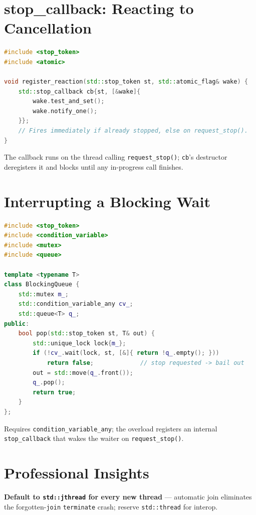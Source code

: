 \section{stop\_callback: Reacting to Cancellation}
\label{sec:c20-jthread-callback}

\begin{lstlisting}[language=C++,caption={Running code the instant a stop is requested}]
#include <stop_token>
#include <atomic>

void register_reaction(std::stop_token st, std::atomic_flag& wake) {
    std::stop_callback cb{st, [&wake]{
        wake.test_and_set();
        wake.notify_one();
    }};
    // Fires immediately if already stopped, else on request_stop().
}
\end{lstlisting}

The callback runs on the thread calling \texttt{request\_stop()}; \texttt{cb}'s destructor deregisters it and blocks until any in-progress call finishes.

\section{Interrupting a Blocking Wait}
\label{sec:c20-jthread-wait}

\begin{lstlisting}[language=C++,caption={A condition-variable wait that honors cancellation}]
#include <stop_token>
#include <condition_variable>
#include <mutex>
#include <queue>

template <typename T>
class BlockingQueue {
    std::mutex m_;
    std::condition_variable_any cv_;
    std::queue<T> q_;
public:
    bool pop(std::stop_token st, T& out) {
        std::unique_lock lock{m_};
        if (!cv_.wait(lock, st, [&]{ return !q_.empty(); }))
            return false;             // stop requested -> bail out
        out = std::move(q_.front());
        q_.pop();
        return true;
    }
};
\end{lstlisting}

Requires \texttt{condition\_variable\_any}; the overload registers an internal \texttt{stop\_callback} that wakes the waiter on \texttt{request\_stop()}.

\section{Professional Insights}
\label{sec:c20-jthread-insights}

\textbf{Default to \texttt{std::jthread} for every new thread} --- automatic join eliminates the forgotten-\texttt{join} \texttt{terminate} crash; reserve \texttt{std::thread} for interop.

